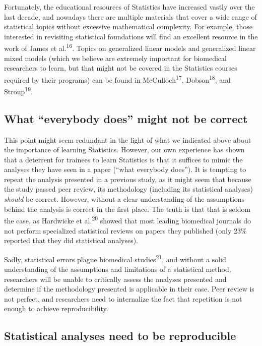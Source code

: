 \documentclass[smallextended]{svjour3}       %
\begin{document}
Fortunately, the educational resources of Statistics have increased
vastly over the last decade, and nowadays there are multiple materials
that cover a wide range of statistical topics without excessive
mathematical complexity. For example, those interested in revisiting
statistical foundations will find an excellent resource in the work of
James et al.\textsuperscript{16}. Topics on generalized linear models
and generalized linear mixed models (which we believe are extremely
important for biomedical researchers to learn, but that might not be
covered in the Statistics courses required by their programs) can be
found in McCulloch\textsuperscript{17}, Dobson\textsuperscript{18}, and
Stroup\textsuperscript{19}.

\hypertarget{what-everybody-does-might-not-be-correct}{%
\subsection{What ``everybody does'' might not be
correct}\label{what-everybody-does-might-not-be-correct}}

This point might seem redundant in the light of what we indicated above
about the importance of learning Statistics. However, our own experience
has shown that a deterrent for trainees to learn Statistics is that it
suffices to mimic the analyses they have seen in a paper (``what
everybody does''). It is tempting to repeat the analysis presented in a
previous study, as it might seem that because the study passed peer
review, its methodology (including its statistical analyses)
\emph{should} be correct. However, without a clear understanding of the
assumptions behind the analysis is correct in the first place. The truth
is that that is seldom the case, as Hardwicke et al.\textsuperscript{20}
showed that most leading biomedical journals do not perform specialized
statistical reviews on papers they published (only 23\% reported that
they did statistical analyses).

Sadly, statistical errors plague biomedical studies\textsuperscript{21},
and without a solid understanding of the assumptions and limitations of
a statistical method, researchers will be unable to critically assess
the analyses presented and determine if the methodology presented is
applicable in their case. Peer review is not perfect, and researchers
need to internalize the fact that repetition is not enough to achieve
reproducibility.

\hypertarget{statistical-analyses-need-to-be-reproducible}{%
\subsection{Statistical analyses need to be
reproducible}\label{statistical-analyses-need-to-be-reproducible}}
\end{document}
